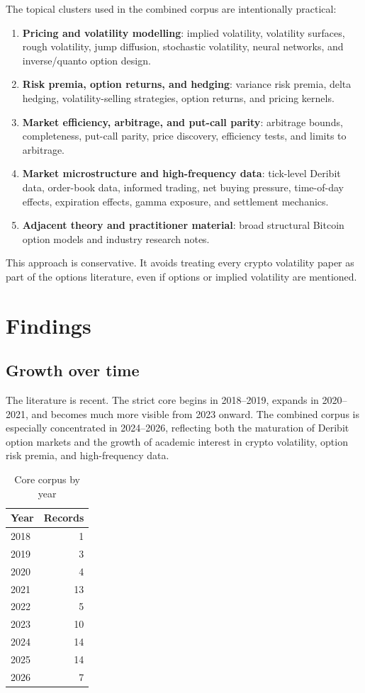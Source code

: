 \documentclass[11pt,a4paper]{article}
\begin{document}
The topical clusters used in the combined corpus are intentionally practical:
\begin{enumerate}
    \item \textbf{Pricing and volatility modelling}: implied volatility, volatility surfaces, rough volatility, jump diffusion, stochastic volatility, neural networks, and inverse/quanto option design.
    \item \textbf{Risk premia, option returns, and hedging}: variance risk premia, delta hedging, volatility-selling strategies, option returns, and pricing kernels.
    \item \textbf{Market efficiency, arbitrage, and put-call parity}: arbitrage bounds, completeness, put-call parity, price discovery, efficiency tests, and limits to arbitrage.
    \item \textbf{Market microstructure and high-frequency data}: tick-level Deribit data, order-book data, informed trading, net buying pressure, time-of-day effects, expiration effects, gamma exposure, and settlement mechanics.
    \item \textbf{Adjacent theory and practitioner material}: broad structural Bitcoin option models and industry research notes.
\end{enumerate}

This approach is conservative. It avoids treating every crypto volatility paper as part of the options literature, even if options or implied volatility are mentioned.

\section{Findings}

\subsection{Growth over time}

The literature is recent. The strict core begins in 2018--2019, expands in 2020--2021, and becomes much more visible from 2023 onward. The combined corpus is especially concentrated in 2024--2026, reflecting both the maturation of Deribit option markets and the growth of academic interest in crypto volatility, option risk premia, and high-frequency data.

\begin{table}[h!]
\centering
\caption{Core corpus by year}
\begin{tabular}{lr}
\toprule
Year & Records \\
\midrule
2018 & 1 \\
2019 & 3 \\
2020 & 4 \\
2021 & 13 \\
2022 & 5 \\
2023 & 10 \\
2024 & 14 \\
2025 & 14 \\
2026 & 7 \\
\bottomrule
\end{tabular}
\end{table}
\end{document}

